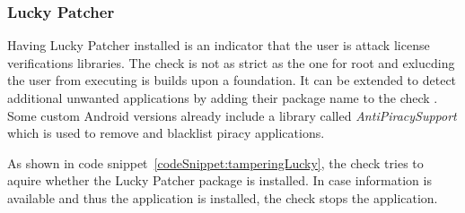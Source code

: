 \subsubsection{Lucky Patcher} \label{subsection:counter-improve-tampering-luckypatcher}
Having Lucky Patcher installed is an indicator that the user is attack license verifications libraries.
The check is not as strict as the one for root and exlucding the user from executing is builds upon a foundation.
It can be extended to detect additional unwanted applications by adding their package name to the check \cite{androidCrackingTools}.
Some custom Android versions already include a library called \textit{AntiPiracySupport} \cite{antipiracy} which is used to remove and blacklist piracy applications.
\newline

As shown in code snippet~\ref{codeSnippet:tamperingLucky}, the check tries to aquire whether the Lucky Patcher package is installed.
In case information is available and thus the application is installed, the check stops the application.
